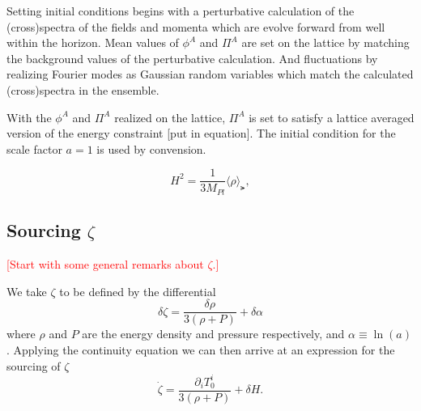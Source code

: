 Setting initial conditions begins with a perturbative calculation of the (cross)spectra of the fields and momenta which are evolve forward from well within the horizon.
Mean values of $\phi^A$ and $\Pi^A$ are set on the lattice by matching the background values of the perturbative calculation.
And fluctuations by realizing Fourier modes as Gaussian random variables which match the calculated (cross)spectra in the ensemble.

With the $\phi^A$ and $\Pi^A$ realized on the lattice, $\Pi^A$ is set to satisfy a lattice averaged version of the energy constraint [put in equation].
The initial condition for the scale factor $a=1$ is used by convension.
  
\begin{equation} \label{eq:energy constraint}
  H^2 = \frac{1}{3M_{Pl}}\langle \rho \rangle_\lat,
\end{equation}

\subsection{Sourcing $\zeta$}
\textcolor{red}{[Start with some general remarks about $\zeta$.]}

We take $\zeta$ to be defined by the differential
\begin{equation} \label{eq:zeta differential}
  \delta\zeta = \frac{\delta\rho}{3(\rho + P)} + \delta\alpha
\end{equation} 
where $\rho$ and $P$ are the energy density and pressure respectively, and $\alpha \equiv \ln(a)$.
Applying the continuity equation we can then arrive at an expression for the sourcing of $\zeta$
\begin{equation} \label{eq:zeta source T}
  \dot{\zeta} = \frac{\partial_iT^i_0}{3(\rho+P)} + \delta H. %
\end{equation}

